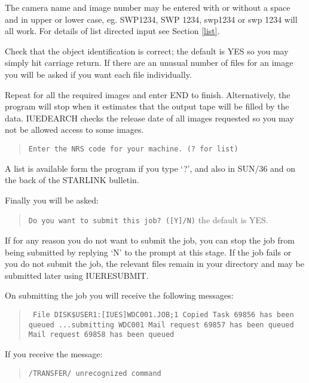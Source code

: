The camera name and image number 
may be entered with or without a space and in upper or lower case,
eg. SWP1234, SWP 1234,
swp1234 or swp 1234 will all work. For details of list directed input see
Section \ref{list}.

Check that the object identification is correct; the default is YES so you may 
simply hit carriage return. If there are an unusual number of files for an
image you will be asked if you want each file individually. 

Repeat for all the required images and enter END to finish.
Alternatively, the program will stop when it estimates that the output tape will
be filled by the data.
IUEDEARCH checks the release date of all images requested so you may not be
allowed access to some images.

\begin{quote}
{\tt Enter the NRS code for your machine. (? for list)}
\end{quote}

A list is available form the program if you type `?',
and also in SUN/36 and on the back of the STARLINK bulletin.

Finally you will be asked:

\begin{quote}
{\tt Do you want to submit this job? ([Y]/N)} the default is YES.
\end{quote}

If for any reason you do not want to submit the job, you can stop the job from 
being
submitted by replying `N' to the prompt at this stage.
If the job fails or you do not submit the job, the relevant files remain in your
directory and may be submitted later using IUERESUBMIT. 

On submitting the job you will receive the following messages:

\begin{quote}
\tt
File DISK\$USER1:[IUES]WDC001.JOB;1 Copied
\newline
Task 69856 has been queued
\newline
...submitting WDC001
\newline
Mail request 69857 has been queued
\newline
Mail request 69858 has been queued
\end{quote}

\rm
If you receive the message:

\begin{quote}
{\tt /TRANSFER/ unrecognized command}
\end{quote}

